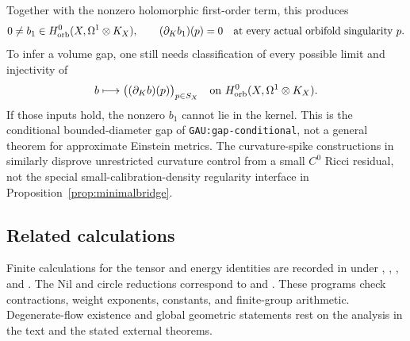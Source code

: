 \documentclass[a4paper,11pt]{article}
\numberwithin{equation}{section}
\theoremstyle{definition}
\begin{document}
Together with the nonzero holomorphic first-order term, this produces
\[
0\ne b_1\in H^0_{\rm orb}(X,\Omega^1\otimes K_X),\qquad
(\partial_Kb_1)(p)=0\quad\text{at every actual orbifold singularity }p.
\]
To infer a volume gap, one still needs classification of every possible limit and injectivity of
\begin{equation}\label{eq:finite-evaluation-interface}
b\longmapsto\bigl((\partial_Kb)(p)\bigr)_{p\in S_X}
\quad\text{on }H^0_{\rm orb}(X,\Omega^1\otimes K_X).
\end{equation}
If those inputs hold, the nonzero $b_1$ cannot lie in the kernel. This is the conditional bounded-diameter gap of \texttt{GAU:gap-conditional}, not a general theorem for approximate Einstein metrics. The curvature-spike constructions in  similarly disprove unrestricted curvature control from a small $C^0$ Ricci residual, not the special small-calibration-density regularity interface in Proposition~\ref{prop:minimalbridge}.

\subsection{Related calculations}
Finite calculations for the tensor and energy identities are recorded in
 under
,
,
, and
.
The Nil and circle reductions correspond to
 and
.
These programs check contractions, weight exponents, constants, and finite-group arithmetic. Degenerate-flow existence and global geometric statements rest on the analysis in the text and the stated external theorems.
\end{document}

